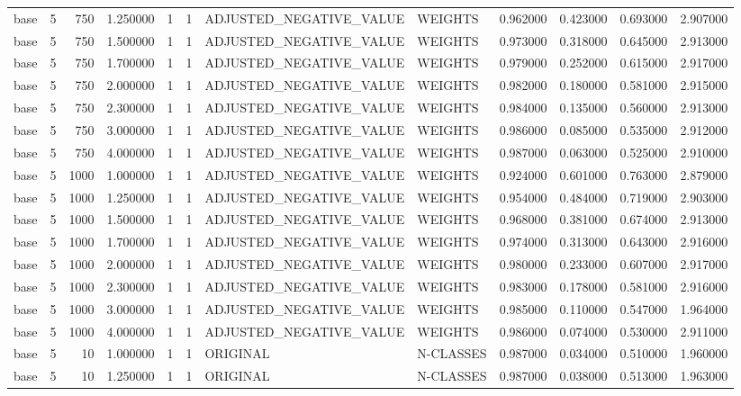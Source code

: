 \begin{tabular}{lrrrllllrrrr}
base & 5 & 750 & 1.250000 & 1 & 1 & ADJUSTED_NEGATIVE_VALUE & WEIGHTS & 0.962000 & 0.423000 & 0.693000 & 2.907000 \\
base & 5 & 750 & 1.500000 & 1 & 1 & ADJUSTED_NEGATIVE_VALUE & WEIGHTS & 0.973000 & 0.318000 & 0.645000 & 2.913000 \\
base & 5 & 750 & 1.700000 & 1 & 1 & ADJUSTED_NEGATIVE_VALUE & WEIGHTS & 0.979000 & 0.252000 & 0.615000 & 2.917000 \\
base & 5 & 750 & 2.000000 & 1 & 1 & ADJUSTED_NEGATIVE_VALUE & WEIGHTS & 0.982000 & 0.180000 & 0.581000 & 2.915000 \\
base & 5 & 750 & 2.300000 & 1 & 1 & ADJUSTED_NEGATIVE_VALUE & WEIGHTS & 0.984000 & 0.135000 & 0.560000 & 2.913000 \\
base & 5 & 750 & 3.000000 & 1 & 1 & ADJUSTED_NEGATIVE_VALUE & WEIGHTS & 0.986000 & 0.085000 & 0.535000 & 2.912000 \\
base & 5 & 750 & 4.000000 & 1 & 1 & ADJUSTED_NEGATIVE_VALUE & WEIGHTS & 0.987000 & 0.063000 & 0.525000 & 2.910000 \\
base & 5 & 1000 & 1.000000 & 1 & 1 & ADJUSTED_NEGATIVE_VALUE & WEIGHTS & 0.924000 & 0.601000 & 0.763000 & 2.879000 \\
base & 5 & 1000 & 1.250000 & 1 & 1 & ADJUSTED_NEGATIVE_VALUE & WEIGHTS & 0.954000 & 0.484000 & 0.719000 & 2.903000 \\
base & 5 & 1000 & 1.500000 & 1 & 1 & ADJUSTED_NEGATIVE_VALUE & WEIGHTS & 0.968000 & 0.381000 & 0.674000 & 2.913000 \\
base & 5 & 1000 & 1.700000 & 1 & 1 & ADJUSTED_NEGATIVE_VALUE & WEIGHTS & 0.974000 & 0.313000 & 0.643000 & 2.916000 \\
base & 5 & 1000 & 2.000000 & 1 & 1 & ADJUSTED_NEGATIVE_VALUE & WEIGHTS & 0.980000 & 0.233000 & 0.607000 & 2.917000 \\
base & 5 & 1000 & 2.300000 & 1 & 1 & ADJUSTED_NEGATIVE_VALUE & WEIGHTS & 0.983000 & 0.178000 & 0.581000 & 2.916000 \\
base & 5 & 1000 & 3.000000 & 1 & 1 & ADJUSTED_NEGATIVE_VALUE & WEIGHTS & 0.985000 & 0.110000 & 0.547000 & 1.964000 \\
base & 5 & 1000 & 4.000000 & 1 & 1 & ADJUSTED_NEGATIVE_VALUE & WEIGHTS & 0.986000 & 0.074000 & 0.530000 & 2.911000 \\
base & 5 & 10 & 1.000000 & 1 & 1 & ORIGINAL & N-CLASSES & 0.987000 & 0.034000 & 0.510000 & 1.960000 \\
base & 5 & 10 & 1.250000 & 1 & 1 & ORIGINAL & N-CLASSES & 0.987000 & 0.038000 & 0.513000 & 1.963000 \\

\end{tabular}
